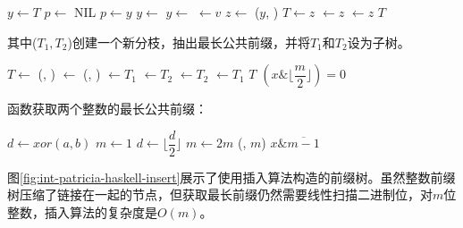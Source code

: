 \documentclass[b5paper]{ctexart}
\begin{document}
\begin{algorithmic}[1]
    \State \Return {}
  \EndIf
  \State $y \gets T$
  \State $p \gets$ NIL
    \State $p \gets y$
      \State $y \gets$ 
    \Else
      \State $y \gets$ 
    \EndIf
  \EndWhile
    \State {} $\gets v$
  \Else
    \State $z \gets$ ($y$, )
      \State $T \gets z$
    \Else
        \State {} $\gets z$
      \Else
        \State {} $\gets z$
      \EndIf
    \EndIf
  \EndIf
  \State \Return $T$
\EndFunction
\end{algorithmic}

其中($T_1, T_2$)创建一个新分枝，抽出最长公共前缀，并将$T_1$和$T_2$设为子树。

\begin{algorithmic}[1]
  \State $T \gets$ 
  \State (, ) $\gets$ (, )
    \State {} $\gets T_1$
    \State {} $\gets T_2$
  \Else
    \State {} $\gets T_2$
    \State {} $\gets T_1$
  \EndIf
  \State \Return $T$
\EndFunction
\Statex
{}
  \State \Return $(x \& \lfloor \dfrac{m}{2} \rfloor) = 0$
\EndFunction
\end{algorithmic}

函数获取两个整数的最长公共前缀：

\begin{algorithmic}[1]
  \State $d \gets xor(a, b)$
  \State $m \gets 1$
    \State $d \gets \lfloor \dfrac{d}{2} \rfloor$
    \State $m \gets 2m$
  \EndWhile
  \State \Return (, $m$)
\EndFunction
\Statex
{}
  \State \Return $x \& \overline{m - 1}$
\EndFunction
\Statex
\end{algorithmic}

图\ref{fig:int-patricia-haskell-insert}展示了使用插入算法构造的前缀树。虽然整数前缀树压缩了链接在一起的节点，但获取最长前缀仍然需要线性扫描二进制位，对$m$位整数，插入算法的复杂度是$O(m)$。
\end{document}
